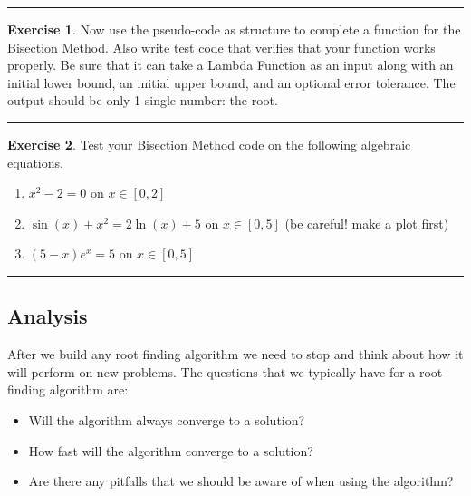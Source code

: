 \documentclass[
]{book}
\providecommand{\tightlist}{%
  \setlength{\itemsep}{0pt}\setlength{\parskip}{0pt}}
\theoremstyle{definition}
\theoremstyle{definition}
\theoremstyle{definition}
\newtheorem{exercise}{Exercise}[chapter]
\theoremstyle{remark}
\begin{document}
\begin{center}\rule{0.5\linewidth}{0.5pt}\end{center}

\begin{exercise}
\protect\hypertarget{exr:unnamed-chunk-82}{}{\label{exr:unnamed-chunk-82} }Now use the pseudo-code as structure to complete a function for the
Bisection Method. Also write test code that verifies that your
function works properly. Be sure that it can take a Lambda Function as an input along with an initial lower
bound, an initial upper bound, and an optional error tolerance. The
output should be only 1 single number: the root.
\end{exercise}

\begin{center}\rule{0.5\linewidth}{0.5pt}\end{center}

\begin{exercise}
\protect\hypertarget{exr:unnamed-chunk-83}{}{\label{exr:unnamed-chunk-83} }Test your Bisection Method code on the following algebraic equations.

\begin{enumerate}
\def\labelenumi{\alph{enumi}.}
\tightlist
\item
  \(x^2 - 2 = 0\) on \(x \in [0,2]\)
\item
  \(\sin(x) + x^2 = 2\ln(x) + 5\) on \(x \in [0,5]\) (be careful! make a
  plot first)
\item
  \((5-x)e^{x}=5\) on \(x \in [0,5]\)
\end{enumerate}
\end{exercise}

\begin{center}\rule{0.5\linewidth}{0.5pt}\end{center}

\hypertarget{analysis}{%
\subsection{Analysis}\label{analysis}}

After we build any root finding algorithm we need to stop and think about how it will perform on new problems. The questions that we typically have for a root-finding algorithm are:

\begin{itemize}
\tightlist
\item
  Will the algorithm always converge to a solution?
\item
  How fast will the algorithm converge to a solution?
\item
  Are there any pitfalls that we should be aware of when using the algorithm?
\end{itemize}
\end{document}
